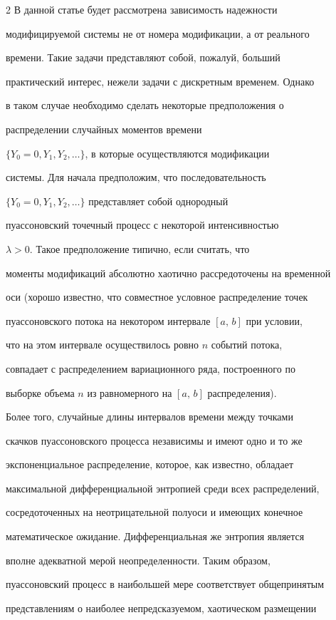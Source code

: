 \begin{multicols}{2}
В данной статье будет рассмотрена зависимость надежности


модифицируемой системы не от номера модификации, а от реального


времени. Такие задачи представляют собой, пожалуй, больший


практический интерес, нежели задачи с дискретным временем. Однако


в таком случае необходимо сделать некоторые предположения о


распределении случайных моментов времени


$\{Y_0=0,Y_1,Y_2,\ldots\}$, в которые осуществляются модификации


системы. Для начала предположим, что последовательность


$\{Y_0=0,Y_1,Y_2,\ldots\}$ представляет собой однородный


пуассоновский точечный процесс с некоторой интенсивностью


$\lambda>0$. Такое предположение типично, если считать, что


моменты модификаций абсолютно хаотично рассредоточены на временной


оси (хорошо известно, что совместное условное распределение точек


пуассоновского потока на некотором интервале $[a,\,b]$ при условии,


что на этом интервале осуществилось ровно $n$ событий потока,


совпадает с распределением вариационного ряда, построенного по


выборке объема $n$ из равномерного на $[a,\,b]$ распределения).


Более того, случайные длины интервалов времени между точками


скачков пуассоновского процесса независимы и имеют одно и то же


экспоненциальное распределение, которое, как известно, обладает


максимальной дифференциальной энтропией среди всех распределений,


сосредоточенных на неотрицательной полуоси и имеющих конечное


математическое ожидание. Дифференциальная же энтропия является


вполне адекватной мерой неопределенности. Таким образом,


пуассоновский процесс в наибольшей мере соответствует общепринятым


представлениям о наиболее непредсказуемом, хаотическом размещении



\end{multicols}
